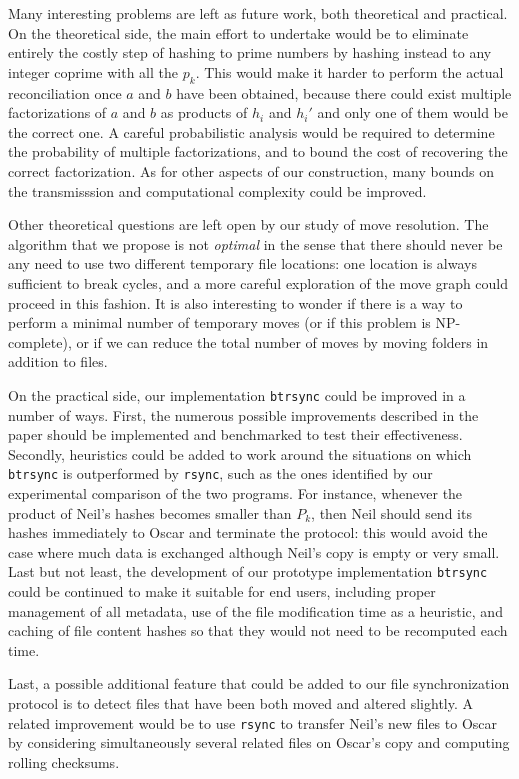 \documentclass{llncs}
\newcommand{\btrsync}{\texttt{btrsync}\xspace}
\newcommand{\rsync}{\texttt{rsync}\xspace}
\begin{document}
Many interesting problems are left as future work, both theoretical and practical. On the theoretical side, the main effort to undertake would be to eliminate entirely the costly step of hashing to prime numbers by hashing instead to any integer coprime with all the $p_k$. This would make it harder to perform the actual reconciliation once $a$ and $b$ have been obtained, because there could exist multiple factorizations of $a$ and $b$ as products of $h_i$ and $h_i'$ and only one of them would be the correct one. A careful probabilistic analysis would be required to determine the probability of multiple factorizations, and to bound the cost of recovering the correct factorization.
As for other aspects of our construction, many bounds on the transmisssion and computational complexity could be improved.

Other theoretical questions are left open by our study of move resolution. The algorithm that we propose is not \emph{optimal} in the sense that there should never be any need to use two different temporary file locations: one location is always sufficient to break cycles, and a more careful exploration of the move graph could proceed in this fashion. It is also interesting to wonder if there is a way to perform a minimal number of temporary moves (or if this problem is NP-complete), or if we can reduce the total number of moves by moving folders in addition to files.

On the practical side, our implementation \btrsync could be improved in a number of ways. First, the numerous possible improvements described in the paper should be implemented and benchmarked to test their effectiveness. Secondly, heuristics could be added to work around the situations on which \btrsync is outperformed by \rsync, such as the ones identified by our experimental comparison of the two programs. For instance, whenever the product of Neil's hashes becomes smaller than $P_k$, then Neil should send its hashes immediately to Oscar and terminate the protocol: this would avoid the case where much data is exchanged although Neil's copy is empty or very small. Last but not least, the development of our prototype implementation \btrsync could be continued to make it suitable for end users, including proper management of all metadata, use of the file modification time as a heuristic, and caching of file content hashes so that they would not need to be recomputed each time.

Last, a possible additional feature that could be added to our file synchronization protocol is to detect files that have been both moved and altered slightly. A related improvement would be to use \rsync to transfer Neil's new files to Oscar by considering simultaneously several related files on Oscar's copy and computing rolling checksums.
\end{document}
